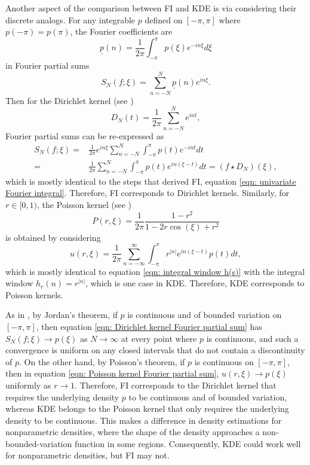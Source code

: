 \documentclass[%
 reprint,
 amsmath,amssymb,
 aps,
]{revtex4-2}
\begin{document}
Another aspect of the comparison between FI and KDE is via considering their discrete analogs. For any integrable $p$ defined on $[-\pi, \pi]$ where $p(-\pi) = p(\pi)$, the Fourier coefficients are
\begin{equation*}
    \underline{p}(n) = \frac{1}{2\pi}\int_{-\pi}^\pi p(\xi) e^{-in\xi}d\xi
\end{equation*}
in Fourier partial sums
\begin{equation*}
    S_N(f; \xi) = \sum_{n = -N}^N \underline{p}(n) e^{in\xi}.
\end{equation*}
Then for the Dirichlet kernel (see \cite{bhatia2005fourier})
\begin{equation*}
    D_N(t) = \frac{1}{2\pi} \sum_{n = -N}^N e^{int},
\end{equation*}
Fourier partial sums can be re-expressed as
\begin{align} \label{eqn: Dirichlet kernel Fourier partial sum}
    S_N(f; \xi) = & \frac{1}{2\pi} e^{in\xi} \sum_{n = -N}^N \int_{-\pi}^\pi p(t) e^{-int}dt\\
    = & \frac{1}{2\pi} \sum_{n = -N}^N \int_{-\pi}^\pi p(t) e^{in(\xi - t)}dt = (f \star D_N)(\xi),
\end{align}
which is mostly identical to the steps that derived FI, equation \eqref{eqn: univariate Fourier integral}. Therefore, FI corresponds to Dirichlet kernels. Similarly, for $r \in [0, 1)$, the Poisson kernel (see \cite{bhatia2005fourier})
\begin{equation*}
    P(r, \xi) = \frac{1}{2\pi} \frac{1-r^2}{1-2r\cos(\xi)+r^2}
\end{equation*}
is obtained by considering
\begin{equation} \label{eqn: Poisson kernel Fourier partial sum}
    u(r, \xi) = \frac{1}{2\pi} \sum_{n = -\infty}^\infty \int_{-\pi}^\pi r^{|n|} e^{in(\xi-t)} p(t)dt,
\end{equation}
which is mostly identical to equation \eqref{eqn: integral window h(s)} with the integral window $h_r(n) = r^{|n|}$, which is one case in KDE. Therefore, KDE corresponds to Poisson kernels.

As in \cite{bhatia2005fourier}, by Jordan's theorem, if $p$ is continuous and of bounded variation on $[-\pi, \pi]$, then equation \eqref{eqn: Dirichlet kernel Fourier partial sum} has $\displaystyle S_N(f; \xi) \to p(\xi)$ as $N \to \infty$ at every point where $p$ is continuous, and such a convergence is uniform on any closed intervals that do not contain a discontinuity of $p$. On the other hand, by Poisson's theorem, if $p$ is continuous on $[-\pi, \pi]$, then in equation \eqref{eqn: Poisson kernel Fourier partial sum}, $u(r, \xi) \to p(\xi)$ uniformly as $r \to 1$. Therefore, FI corresponds to the Dirichlet kernel that requires the underlying density $p$ to be continuous and of bounded variation, whereas KDE belongs to the Poisson kernel that only requires the underlying density to be continuous. This makes a difference in density estimations for nonparametric densities, where the shape of the density approaches a non-bounded-variation function in some regions. Consequently, KDE could work well for nonparametric densities, but FI may not.
\end{document}
